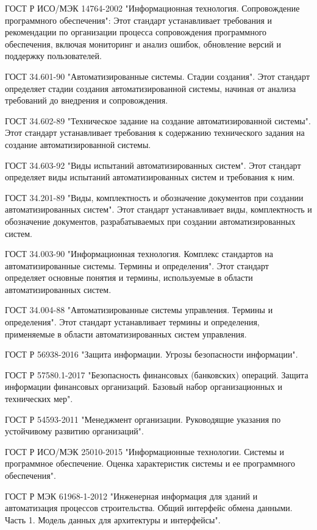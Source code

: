 ГОСТ Р ИСО/МЭК 14764-2002 "Информационная технология. Сопровождение программного обеспечения": Этот стандарт устанавливает требования и рекомендации по организации процесса сопровождения программного обеспечения, включая мониторинг и анализ ошибок, обновление версий и поддержку пользователей.



ГОСТ 34.601-90 "Автоматизированные системы. Стадии создания". Этот стандарт определяет стадии создания автоматизированной системы, начиная от анализа требований до внедрения и сопровождения.

ГОСТ 34.602-89 "Техническое задание на создание автоматизированной системы". Этот стандарт устанавливает требования к содержанию технического задания на создание автоматизированной системы.

ГОСТ 34.603-92 "Виды испытаний автоматизированных систем". Этот стандарт определяет виды испытаний автоматизированных систем и требования к ним.

ГОСТ 34.201-89 "Виды, комплектность и обозначение документов при создании автоматизированных систем". Этот стандарт устанавливает виды, комплектность и обозначение документов, разрабатываемых при создании автоматизированных систем.

ГОСТ 34.003-90 "Информационная технология. Комплекс стандартов на автоматизированные системы. Термины и определения". Этот стандарт определяет основные понятия и термины, используемые в области автоматизированных систем.

ГОСТ 34.004-88 "Автоматизированные системы управления. Термины и определения". Этот стандарт устанавливает термины и определения, применяемые в области автоматизированных систем управления.

ГОСТ Р 56938-2016 "Защита информации. Угрозы безопасности информации".

ГОСТ Р 57580.1-2017 "Безопасность финансовых (банковских) операций. Защита информации финансовых организаций. Базовый набор организационных и технических мер".

ГОСТ Р 54593-2011 "Менеджмент организации. Руководящие указания по устойчивому развитию организаций".

ГОСТ Р ИСО/МЭК 25010-2015 "Информационные технологии. Системы и программное обеспечение. Оценка характеристик системы и ее программного обеспечения".

ГОСТ Р МЭК 61968-1-2012 "Инженерная информация для зданий и автоматизация процессов строительства. Общий интерфейс обмена данными. Часть 1. Модель данных для архитектуры и интерфейсы".

